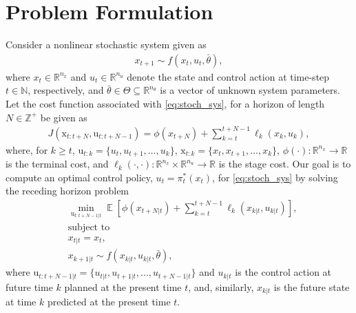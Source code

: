 \documentclass[letterpaper, 10 pt, conference]{IEEEconf}
\renewcommand{\Re}{\mathbb{R}}
\newcommand{\Expectation}{\mathop{{}\mathbb{E}}}
\begin{document}
\section{Problem Formulation} \label{sec:problem_formulation}

Consider a nonlinear stochastic system given as
\begin{align}\label{eq:stoch_sys}
    x_{t+1} \sim f(x_{t}, u_{t}, \bar{\theta}),
\end{align}
where $x_{t} \in \Re^{n_x}$ and $u_{t} \in \Re^{n_u}$ denote the state and control action at time-step $t \in \mathbb{N}$, respectively, and $\bar{\theta} \in \Theta \subseteq \Re^{n_\theta}$ is a vector of unknown system parameters.
% 
Let the cost function associated with \eqref{eq:stoch_sys}, for a horizon of length $N \in \mathbb{Z}^{+}$ be given as
\begin{align} \label{eq:horizon_cost}
    J(\mathrm{x}_{t:t+N}, \mathrm{u}_{t:t+N-1}) = \phi(x_{t+N}) + \sum_{k=t}^{t+N-1} \ell_{k}(x_{k}, u_{k}),
\end{align}
where, for $k \geq t$, $\mathrm{u}_{t:k} = \{u_{t}, u_{t+1}, \dots, u_{k}\}$, $\mathrm{x}_{t:k} = \{x_{t}, x_{t+1}, \dots, x_{k}\}$, $\phi(\cdot) : \Re^{n_x} \rightarrow \Re$ is the terminal cost, and $\ell_{k}(\cdot, \cdot) : \Re^{n_x} \times \Re^{n_u} \rightarrow \Re$ is the stage cost.
% 
Our goal is to compute an optimal control policy, $u_{t} = \pi^{\ast}_{t}(x_{t})$, for \eqref{eq:stoch_sys} by solving the receding horizon problem
\begin{subequations} \label{prob:ideal}
    \begin{align}
        & \min_{\mathrm{u}_{t:t+N-1|t}} \Expectation \left[\phi(x_{t+N|t}) + \sum_{k=t}^{t+N-1} \ell_{k}(x_{k|t}, u_{k|t}) \right], \label{cost:ideal} \\
        & \text{subject to} \nonumber\\
        & x_{t|t} = x_{t}, \\
        & x_{k+1|t} \sim f(x_{k|t}, u_{k|t}, \bar{\theta}),
    \end{align}
\end{subequations}
where $\mathrm{u}_{t:t+N-1|t} = \{u_{t|t}, u_{t+1|t}, \dots, u_{t+N-1|t}\}$ and $u_{k|t}$ is the control action at future time $k$ planned at the present time $t$, and, similarly, $x_{k|t}$ is the future state at time $k$ predicted at the present time $t$.
\end{document}
